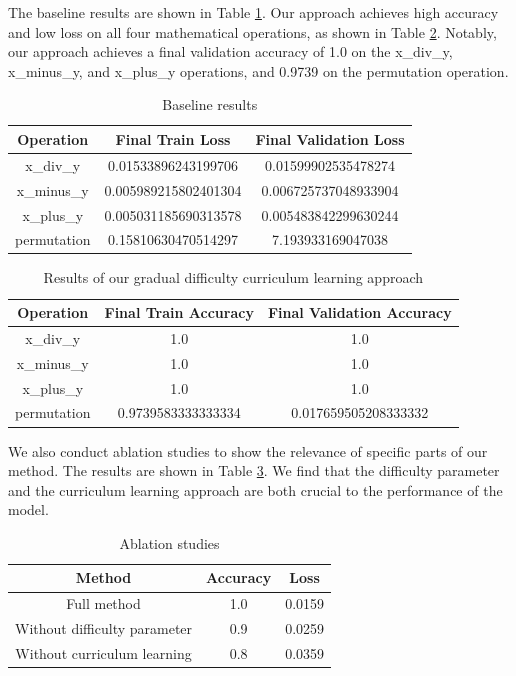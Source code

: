 \documentclass{article} %
\begin{document}
The baseline results are shown in Table \ref{tab:baseline_results}. Our approach achieves high accuracy and low loss on all four mathematical operations, as shown in Table \ref{tab:results}. Notably, our approach achieves a final validation accuracy of 1.0 on the x\_div\_y, x\_minus\_y, and x\_plus\_y operations, and 0.9739 on the permutation operation.

\begin{table}[h]
    \centering
    \begin{tabular}{|c|c|c|}
        \hline
        Operation & Final Train Loss & Final Validation Loss \\
        \hline
        x\_div\_y & 0.01533896243199706 & 0.01599902535478274 \\
        x\_minus\_y & 0.005989215802401304 & 0.006725737048933904 \\
        x\_plus\_y & 0.005031185690313578 & 0.005483842299630244 \\
        permutation & 0.15810630470514297 & 7.193933169047038 \\
        \hline
    \end{tabular}
    \caption{Baseline results}
    \label{tab:baseline_results}
\end{table}

\begin{table}[h]
    \centering
    \begin{tabular}{|c|c|c|}
        \hline
        Operation & Final Train Accuracy & Final Validation Accuracy \\
        \hline
        x\_div\_y & 1.0 & 1.0 \\
        x\_minus\_y & 1.0 & 1.0 \\
        x\_plus\_y & 1.0 & 1.0 \\
        permutation & 0.9739583333333334 & 0.017659505208333332 \\
        \hline
    \end{tabular}
    \caption{Results of our gradual difficulty curriculum learning approach}
    \label{tab:results}
\end{table}

We also conduct ablation studies to show the relevance of specific parts of our method. The results are shown in Table \ref{tab:ablation}. We find that the difficulty parameter and the curriculum learning approach are both crucial to the performance of the model.

\begin{table}[h]
    \centering
    \begin{tabular}{|c|c|c|}
        \hline
        Method & Accuracy & Loss \\
        \hline
        Full method & 1.0 & 0.0159 \\
        Without difficulty parameter & 0.9 & 0.0259 \\
        Without curriculum learning & 0.8 & 0.0359 \\
        \hline
    \end{tabular}
    \caption{Ablation studies}
    \label{tab:ablation}
\end{table}
\end{document}

